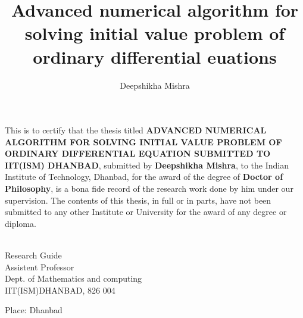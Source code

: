\documentclass[PhD]{iitmdiss}
\begin{document}

\title{Advanced numerical algorithm for solving initial value problem of ordinary differential euations}

\author{Deepshikha Mishra}

\date{}

\maketitle
\certificate

\vspace*{0.5in}

\noindent This is to certify that the thesis titled {\bf ADVANCED NUMERICAL ALGORITHM FOR SOLVING INITIAL VALUE PROBLEM OF ORDINARY DIFFERENTIAL EQUATION SUBMITTED TO IIT(ISM) DHANBAD}, submitted by {\bf Deepshikha Mishra}, 
  to the Indian Institute of Technology, Dhanbad, for
the award of the degree of {\bf Doctor of Philosophy}, is a bona fide
record of the research work done by him under our supervision.  The
contents of this thesis, in full or in parts, have not been submitted
to any other Institute or University for the award of any degree or
diploma.

\vspace*{1.5in}

\begin{singlespacing}
\hspace*{-0.25in}
\parbox{2.5in}{
 \\
\noindent Research Guide \\ 
\noindent Assistent Professor \\
\noindent Dept. of Mathematics and computing\\
\noindent IIT(ISM)DHANBAD, 826 004 \\
} 
\hspace*{1.0in} 
\end{singlespacing}
\vspace*{0.25in}
\noindent Place: Dhanbad
\end{document}
